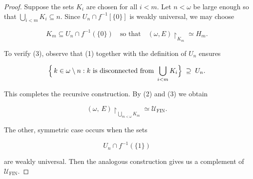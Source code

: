 \documentclass[10pt,a4paper]{amsart}
\DeclareMathOperator{\fin}{FIN}
\newcommand{\UU}{\mathcal{U}}
\begin{document}
\begin{proof}
Suppose the sets \(K_{i}\) are chosen for all \(i<m\).  
Let \(n<\omega\) be large enough so that \(\bigcup_{i<m} K_{i} \subseteq n\).  
Since \(U_{n}\cap f^{-1}[\{0\}]\) is weakly universal, we may choose


\[
K_{m} \subseteq U_{n}\cap f^{-1}(\{0\})
\quad\text{so that}\quad
(\omega, E)\restriction_{K_{m}} \simeq H_{m}.
\]


To verify (3), observe that (1) together with the definition of \(U_{n}\) ensures


\[
\Bigl\{\,k \in \omega\setminus n : k \text{ is disconnected from } \bigcup_{i<m} K_{i}\Bigr\}
\;\supseteq\; U_{n}.
\]


This completes the recursive construction.  
By (2) and (3) we obtain


$$(\omega,\, E)\restriction_{\bigcup\limits_{m<\omega}K_m} \simeq \UU_{\fin}.$$



The other, symmetric case occurs when the sets


\[
U_{n}\cap f^{-1}(\{1\})
\]


are weakly universal.  Then the analogous construction gives us a complement of $\UU_{\fin}$.
\end{proof}
\end{document}
